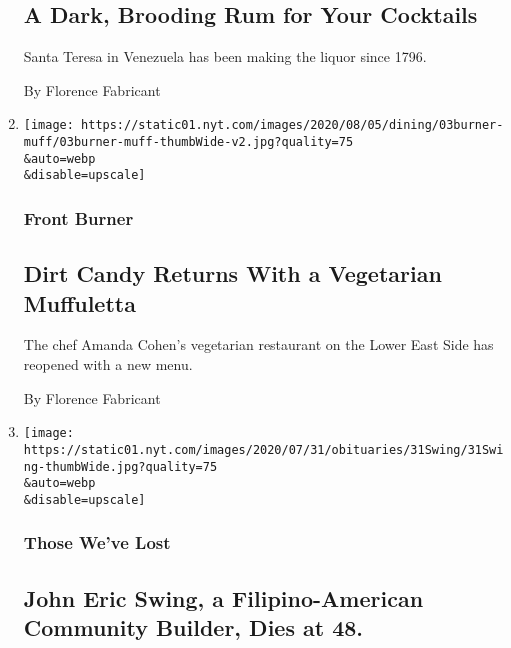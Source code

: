 \begin{enumerate}
  \hypertarget{a-dark-brooding-rum-for-your-cocktails}{%
  \subsection{A Dark, Brooding Rum for Your
  Cocktails}\label{a-dark-brooding-rum-for-your-cocktails}}

  Santa Teresa in Venezuela has been making the liquor since 1796.

  By Florence Fabricant
\item
  \href{/2020/08/03/dining/dirt-candy-vegetarian-muffuletta.html}{}

  \texttt{[image: https://static01.nyt.com/images/2020/08/05/dining/03burner-muff/03burner-muff-thumbWide-v2.jpg?quality=75\\\&auto=webp\\\&disable=upscale]}

  \hypertarget{front-burner-6}{%
  \subsubsection{Front Burner}\label{front-burner-6}}

  \hypertarget{dirt-candy-returns-with-a-vegetarian-muffuletta}{%
  \subsection{Dirt Candy Returns With a Vegetarian
  Muffuletta}\label{dirt-candy-returns-with-a-vegetarian-muffuletta}}

  The chef Amanda Cohen's vegetarian restaurant on the Lower East Side
  has reopened with a new menu.

  By Florence Fabricant
\item
  \href{/2020/08/03/obituaries/john-swing-dead-coronavirus.html}{}

  \texttt{[image: https://static01.nyt.com/images/2020/07/31/obituaries/31Swing/31Swing-thumbWide.jpg?quality=75\\\&auto=webp\\\&disable=upscale]}

  \hypertarget{those-weve-lost}{%
  \subsubsection{Those We've Lost}\label{those-weve-lost}}

  \hypertarget{john-eric-swing-a-filipino-american-community-builder-dies-at-48}{%
  \subsection{John Eric Swing, a Filipino-American Community Builder,
  Dies at
  48.}\label{john-eric-swing-a-filipino-american-community-builder-dies-at-48}}


\end{enumerate}
